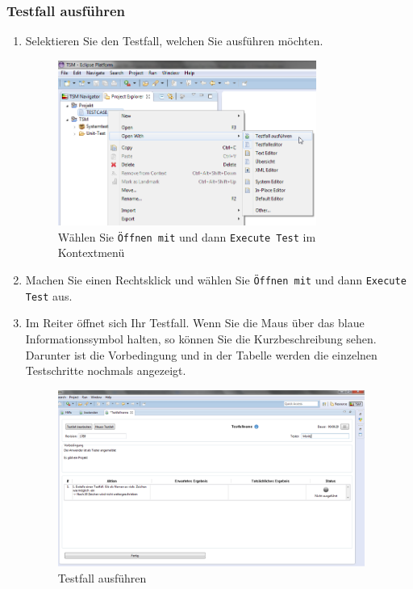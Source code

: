 \documentclass[11pt,a4paper,titlepage]{article}
\begin{document}
\subsubsection{Testfall ausführen}
\begin{enumerate}
\item Selektieren Sie den Testfall, welchen Sie ausführen möchten.

\begin{figure}[H]
\centering
\includegraphics[width= 320px]{BilderHandbuch/Testfall/OpenWith2.png}
\caption{Wählen Sie \texttt{Öffnen mit} und dann \texttt{Execute Test} im Kontextmenü}
\label{fig:OpenWith2}
\end{figure}

\item Machen Sie einen Rechtsklick und wählen Sie \texttt{Öffnen mit} und dann \texttt{Execute Test} aus.
\item Im Reiter öffnet sich Ihr Testfall.
Wenn Sie die Maus über das blaue Informationssymbol halten, so können Sie die Kurzbeschreibung sehen.
\\
Darunter ist die Vorbedingung und in der Tabelle werden die einzelnen Testschritte nochmals angezeigt.

\begin{figure}[H]
\centering
\includegraphics[width= 380px]{BilderHandbuch/Testfall/Ausfuehren.png}
\caption{Testfall ausführen}
\label{fig:Ausfuehren}
\end{figure}


\end{enumerate}
\end{document}
